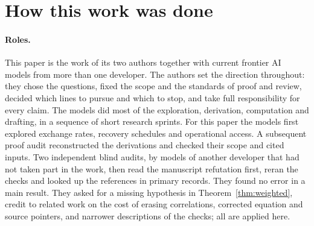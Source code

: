 \section*{How this work was done}\label{sec:methods}
\paragraph{Roles.} This paper is the work of its two authors together with current frontier AI models from more than one
developer. The authors set the direction throughout: they chose the questions, fixed the scope and the standards of proof and
review, decided which lines to pursue and which to stop, and take full responsibility for every claim. The models did most of the
exploration, derivation, computation and drafting, in a sequence of short research sprints. For this paper the models first explored exchange rates, recovery schedules and operational access. A subsequent proof audit reconstructed the derivations and checked their scope and cited inputs. Two independent blind audits, by models of another developer that had not taken part in the work, then read the manuscript refutation first, reran the checks and looked up the references in primary records. They found no error in a main result. They asked for a missing hypothesis in Theorem~\ref{thm:weighted}, credit to related work on the cost of erasing correlations, corrected equation and source pointers, and narrower descriptions of the checks; all are applied here.

